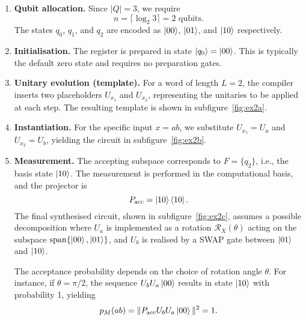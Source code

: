 \begin{enumerate}
  \item \textbf{Qubit allocation.} Since $|Q| = 3$, we require
  \[
  n = \lceil \log_2 3 \rceil = 2 \text{ qubits}.
  \]
  The states $q_0$, $q_1$, and $q_2$ are encoded as $\ket{00}$, $\ket{01}$, and $\ket{10}$ respectively.

  \item \textbf{Initialisation.} The register is prepared in state $\ket{q_0} = \ket{00}$. This is typically the default zero state and requires no preparation gates.

  \item \textbf{Unitary evolution (template).} For a word of length $L = 2$, the compiler inserts two placeholders $\boxed{U_{x_1}}$ and $\boxed{U_{x_2}}$, representing the unitaries to be applied at each step. The resulting template is shown in subfigure~\ref{fig:ex2a}.

  \item \textbf{Instantiation.} For the specific input $x = ab$, we substitute $U_{x_1} = U_a$ and $U_{x_2} = U_b$, yielding the circuit in subfigure~\ref{fig:ex2b}.

  \item \textbf{Measurement.} The accepting subspace corresponds to $F = \{q_2\}$, i.e., the basis state $\ket{10}$. The measurement is performed in the computational basis, and the projector is
  \[
  P_{\text{acc}} = \ket{10}\bra{10}.
  \]
  The final synthesised circuit, shown in subfigure~\ref{fig:ex2c}, assumes a possible decomposition where $U_a$ is implemented as a rotation $\mathcal{R}_X(\theta)$ acting on the subspace $\mathrm{span}\{\ket{00}, \ket{01}\}$, and $U_b$ is realised by a SWAP gate between $\ket{01}$ and $\ket{10}$.

  The acceptance probability depends on the choice of rotation angle $\theta$. For instance, if $\theta = \pi/2$, the sequence $U_b U_a \ket{00}$ results in state $\ket{10}$ with probability 1, yielding
  \[
  p_M(ab) = \|P_{\text{acc}} U_b U_a \ket{00}\|^2 = 1.
  \]
\end{enumerate}
\vspace{1em}
